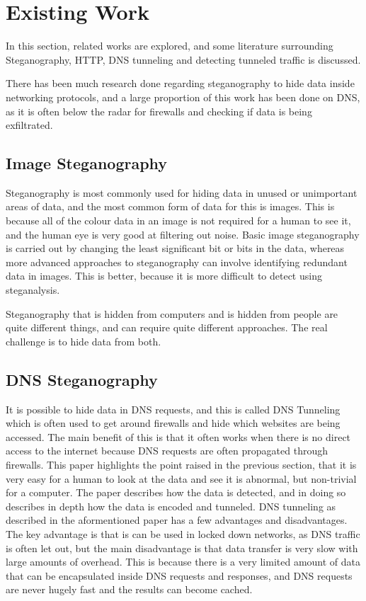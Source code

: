 \section{Existing Work}
In this section, related works are explored, and some literature surrounding Steganography, HTTP, DNS tunneling and detecting tunneled traffic is discussed.

There has been much research done regarding steganography to hide data inside networking protocols, and a large proportion of this work has been done on DNS, as it is often below the radar for firewalls and checking if data is being exfiltrated.
\subsection{Image Steganography}
Steganography is most commonly used for hiding data in unused or unimportant areas of data\cite{exploringsteno}, and the most common form of data for this is images. This is because all of the colour data in an image is not required for a human to see it, and the human eye is very good at filtering out noise.
Basic image steganography is carried out by changing the least significant bit or bits in the data, whereas more advanced approaches to steganography can involve identifying redundant data in images\cite{introsteno}. This is better, because it is more difficult to detect using steganalysis.

Steganography that is hidden from computers and is hidden from people are quite different things, and can require quite different approaches. The real challenge is to hide data from both.

\subsection{DNS Steganography}
It is possible to hide data in DNS requests, and this is called DNS Tunneling which is often used to get around firewalls and hide which websites are being accessed\cite{detectingdns}. The main benefit of this is that it often works when there is no direct access to the internet because DNS requests are often propagated through firewalls.
This paper highlights the point raised in the previous section, that it is very easy for a human to look at the data and see it is abnormal, but non-trivial for a computer.
The paper describes how the data is detected, and in doing so describes in depth how the data is encoded and tunneled.
DNS tunneling as described in the aformentioned paper has a few advantages and disadvantages.
The key advantage is that is can be used in locked down networks, as DNS traffic is often let out, but the main disadvantage is that data transfer is very slow with large amounts of overhead.
This is because there is a very limited amount of data that can be encapsulated inside DNS requests and responses, and DNS requests are never hugely fast and the results can become cached.
